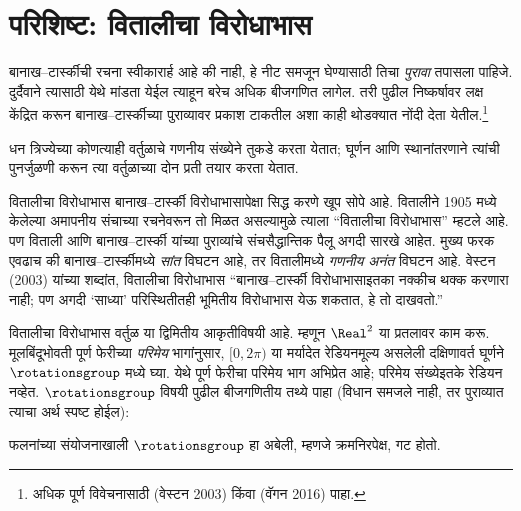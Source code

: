 \section{परिशिष्ट: वितालीचा विरोधाभास}\label{sth:choice:vitali:sec}

बानाख--टार्स्कीची रचना स्वीकारार्ह आहे की नाही, हे नीट समजून घेण्यासाठी तिचा \emph{पुरावा} तपासला पाहिजे. दुर्दैवाने त्यासाठी येथे मांडता येईल त्याहून बरेच अधिक बीजगणित लागेल. तरी पुढील निष्कर्षावर लक्ष केंद्रित करून बानाख--टार्स्कीच्या पुराव्यावर प्रकाश टाकतील अशा काही थोडक्यात नोंदी देता येतील.\footnote{अधिक पूर्ण विवेचनासाठी (वेस्टन 2003) किंवा (वॅगन 2016) पाहा.}

\begin{thm}[वितालीचा विरोधाभास ($\ZFC$ मध्ये)]\label{sth:choice:vitali:vitaliparadox}
धन त्रिज्येच्या कोणत्याही वर्तुळाचे गणनीय संख्येने तुकडे करता येतात; घूर्णन आणि स्थानांतरणाने त्यांची पुनर्जुळणी करून त्या वर्तुळाच्या दोन प्रती तयार करता येतात.
\end{thm}

वितालीचा विरोधाभास बानाख--टार्स्की विरोधाभासापेक्षा सिद्ध करणे खूप सोपे आहे. वितालीने 1905 मध्ये केलेल्या अमापनीय संचाच्या रचनेवरून तो मिळत असल्यामुळे त्याला “वितालीचा विरोधाभास” म्हटले आहे. पण विताली आणि बानाख--टार्स्की यांच्या पुराव्यांचे संचसैद्धान्तिक पैलू अगदी सारखे आहेत. मुख्य फरक एवढाच की बानाख--टार्स्कीमध्ये \emph{सांत} विघटन आहे, तर वितालीमध्ये \emph{गणनीय अनंत} विघटन आहे. वेस्टन (2003) यांच्या शब्दांत, वितालीचा विरोधाभास “बानाख--टार्स्की विरोधाभासाइतका नक्कीच थक्क करणारा नाही; पण अगदी ‘साध्या’ परिस्थितीतही भूमितीय विरोधाभास येऊ शकतात, हे तो दाखवतो.”

वितालीचा विरोधाभास वर्तुळ या द्विमितीय आकृतीविषयी आहे. म्हणून $\Real^2$ या प्रतलावर काम करू. मूलबिंदूभोवती पूर्ण फेरीच्या \emph{परिमेय} भागांनुसार, $[0,2\pi)$ या मर्यादेत रेडियनमूल्य असलेली दक्षिणावर्त घूर्णने $\rotationsgroup$ मध्ये घ्या. येथे पूर्ण फेरीचा परिमेय भाग अभिप्रेत आहे; परिमेय संख्येइतके रेडियन नव्हेत. $\rotationsgroup$ विषयी पुढील बीजगणितीय तथ्ये पाहा (विधान समजले नाही, तर पुराव्यात त्याचा अर्थ स्पष्ट होईल):

\begin{lem}\label{sth:choice:vitali:rotationsgroupabelian}
फलनांच्या संयोजनाखाली $\rotationsgroup$ हा अबेली, म्हणजे क्रमनिरपेक्ष, {गट} होतो.
\end{lem}

